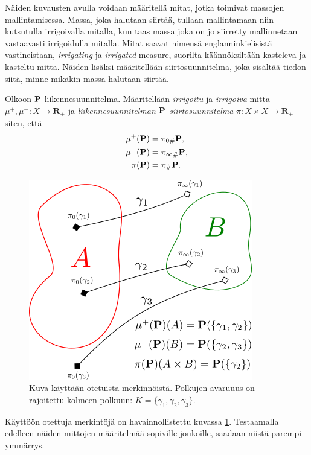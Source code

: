 \documentclass[12pt,oneside,a4paper]{amsbook} %
\begin{document}
Näiden kuvausten avulla voidaan määritellä mitat, jotka toimivat massojen mallintamisessa. Massa, joka halutaan siirtää, tullaan mallintamaan niin kutsutulla irrigoivalla mitalla, kun taas massa joka on jo siirretty mallinnetaan vastaavasti irrigoidulla mitalla. Mitat saavat nimensä englanninkielisistä vastineistaan, \textit{irrigating} ja \textit{irrigated} measure, suorilta käännöksiltään kasteleva ja kasteltu mitta. Näiden lisäksi määritellään siirtosuunnitelma, joka sisältää tiedon siitä, minne mikäkin massa halutaan siirtää.

\begin{definition}
    Olkoon $\P$ liikennesuunnitelma. Määritellään \textit{irrigoitu} ja \textit{irrigoiva} mitta $\mu^+, \mu^- : X \to \mathbf{R}_+$ ja \textit{liikennesuunnitelman $\P$ siirtosuunnitelma} $\pi: X\times X \to \mathbf{R}_+$ siten, että
    \begin{align*}
        \mu^+(\P) &= \pi_{0\#} \P,  \\
        \mu^-(\P) &= \pi_{\infty \#} \P,  \\
        \pi(\P) &= \pi_\# \P.
    \end{align*}
\end{definition}

\begin{figure}
    \centering
    \includegraphics[scale=0.8]{graphics/irrigating-irrigated-tp.png}
    \caption{Kuva käyttään otetuista merkinnöistä. Polkujen avaruuus on rajoitettu kolmeen polkuun: $K = \{\gamma_1, \gamma_2, \gamma_3\}$.}
    \label{fig:irrigated-irrigating-tp}
\end{figure}

Käyttöön otettuja merkintöjä on havainnollistettu kuvassa \ref{fig:irrigated-irrigating-tp}. Testaamalla edelleen näiden mittojen määritelmää sopiville joukoille, saadaan niistä parempi ymmärrys.
\end{document}
